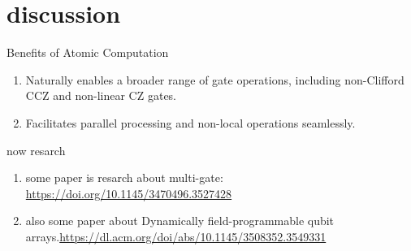 \documentclass[18 pt]{beamer}
\begin{document}
\section{discussion}
\begin{frame}{Benefits of Atomic Computation}
  \begin{enumerate}
  \item Naturally enables a broader range of gate operations, including non-Clifford CCZ and non-linear CZ gates.
  \item Facilitates parallel processing and non-local operations seamlessly.
  \end{enumerate}
\end{frame}
\begin{frame}{now resarch}
  \begin{enumerate}
    \item some paper is resarch about multi-gate: \url{https://doi.org/10.1145/3470496.3527428}
    \item also some paper about Dynamically field-programmable qubit arrays.\url{https://dl.acm.org/doi/abs/10.1145/3508352.3549331}
  \end{enumerate}
\end{frame}
\end{document}
